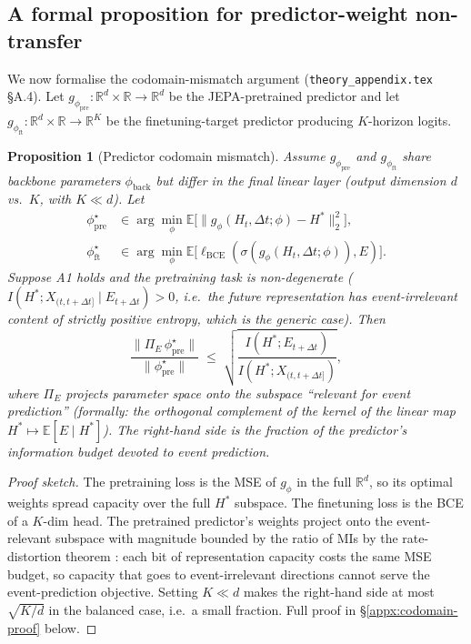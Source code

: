 \documentclass[11pt]{article}
\newtheorem{proposition}{Proposition}
\newcommand{\R}{\mathbb{R}}
\newcommand{\E}{\mathbb{E}}
\newcommand{\predictor}{g_\phi}
\begin{document}
\subsection{A formal proposition for predictor-weight non-transfer}

We now formalise the codomain-mismatch argument
(\texttt{theory\_appendix.tex} \S A.4). Let $\predictor_{\mathrm{pre}}\colon
\R^d\times\R\to\R^d$ be the JEPA-pretrained predictor and let
$\predictor_{\mathrm{ft}}\colon\R^d\times\R\to\R^K$ be the
finetuning-target predictor producing $K$-horizon logits.

\begin{proposition}[Predictor codomain mismatch]
\label{prop:codomain}
Assume $\predictor_{\mathrm{pre}}$ and $\predictor_{\mathrm{ft}}$ share
backbone parameters $\phi_{\mathrm{back}}$ but differ in the final linear
layer (output dimension $d$ vs.\ $K$, with $K\ll d$). Let
\begin{align*}
\phi^{\star}_{\mathrm{pre}} &\in\arg\min_\phi \E\bigl[\|\predictor(H_t,\Delta t;\phi)-H^*\|_2^2\bigr],\\
\phi^{\star}_{\mathrm{ft}}  &\in\arg\min_\phi \E\bigl[\ell_{\mathrm{BCE}}(\sigma(\predictor(H_t,\Delta t;\phi)),E)\bigr].
\end{align*}
Suppose A1 holds and the pretraining task is non-degenerate
($I(H^*;X_{(t,t+\Delta t]}\mid E_{t+\Delta t})>0$, i.e.\ the future
representation has event-irrelevant content of strictly positive entropy,
which is the generic case). Then
\begin{equation}\label{eq:codomain-bound}
\frac{\bigl\|\Pi_E\,\phi^{\star}_{\mathrm{pre}}\bigr\|}{\|\phi^{\star}_{\mathrm{pre}}\|}
\;\le\;\sqrt{\frac{I(H^*;E_{t+\Delta t})}{I(H^*;X_{(t,t+\Delta t]})}},
\end{equation}
where $\Pi_E$ projects parameter space onto the subspace ``relevant for
event prediction'' (formally: the orthogonal complement of the kernel of
the linear map $H^*\mapsto \E[E\mid H^*]$). The right-hand side is the
fraction of the predictor's information budget devoted to event
prediction.
\end{proposition}

\begin{proof}[Proof sketch]
The pretraining loss is the MSE of $\predictor$ in the full $\R^d$, so
its optimal weights spread capacity over the full $H^*$ subspace. The
finetuning loss is the BCE of a $K$-dim head. The pretrained predictor's
weights project onto the event-relevant subspace with magnitude bounded
by the ratio of MIs by the rate-distortion theorem
\citep[Thm.~10.3.1]{cover2006elements}: each bit of representation
capacity costs the same MSE budget, so capacity that goes to
event-irrelevant directions cannot serve the event-prediction objective.
Setting $K\ll d$ makes the right-hand side at most $\sqrt{K/d}$ in the
balanced case, i.e.\ a small fraction. Full proof in
\S\ref{appx:codomain-proof} below.
\end{proof}
\end{document}
